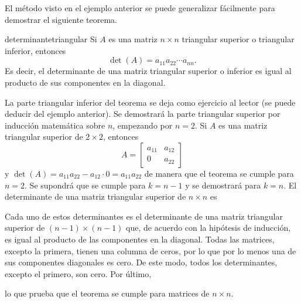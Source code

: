 El método visto en el ejemplo anterior se puede generalizar fácilmente para demostrar el siguiente teorema.

\begin{theorem}{}{determinantetriangular}
    Si $A$ es una matriz $n \times n$ triangular superior o triangular inferior, entonces
    $$\det(A) = a_{11} a_{22} \cdots a_{nn}.$$
    Es decir, el determinante de una matriz triangular superior o inferior es igual al producto de sus componentes en la diagonal.

    \newpage
    \demostracion La parte triangular inferior del teorema se deja como ejercicio al lector (se puede deducir del ejemplo anterior). Se demostrará la parte triangular superior por inducción matemática sobre $n$, empezando por $n = 2$. Si $A$ es una matriz triangular superior de $2 \times 2$, entonces
    $$A = \begin{bmatrix}
        a_{11} & a_{12} \\
        0 & a_{22}
    \end{bmatrix}$$
    y $\det(A) = a_{11} a_{22} - a_{12} \cdot 0 = a_{11}a_{22}$ de manera que el teorema se cumple para $n = 2$. Se supondrá que se cumple para $k = n-1$ y se demostrará para $k = n$. El determinante de una matriz triangular superior de $n \times n$ es
    \begin{matrizn}
    \end{matrizn}
    Cada uno de estos determinantes es el determinante de una matriz triangular superior de $(n - 1) \times (n - 1)$ que, de acuerdo con la hipótesis de inducción, es igual al producto de las componentes en la diagonal. Todas las matrices, excepto la primera, tienen una columna de ceros, por lo que por lo menos una de sus componentes diagonales es cero. De este modo, todos los determinantes, excepto el primero, son cero. Por último,
    \begin{matrizn}
    \end{matrizn}
    lo que prueba que el teorema se cumple para matrices de $n \times n$.
\end{theorem}

